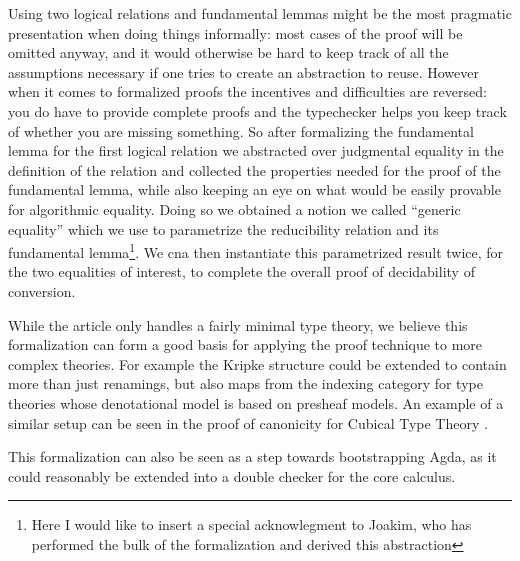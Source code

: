 \documentclass{book}
\begin{document}
Using two logical relations and fundamental lemmas might be the most
pragmatic presentation when doing things informally: most cases of the
proof will be omitted anyway, and it would otherwise be hard to keep
track of all the assumptions necessary if one tries to create an
abstraction to reuse. However when it comes to formalized proofs the
incentives and difficulties are reversed: you do have to provide
complete proofs and the typechecker helps you keep track of whether
you are missing something. So after formalizing the fundamental lemma
for the first logical relation we abstracted over judgmental equality
in the definition of the relation and collected the properties needed
for the proof of the fundamental lemma, while also keeping an eye on
what would be easily provable for algorithmic equality.  Doing so we
obtained a notion we called ``generic equality'' which we use to
parametrize the reducibility relation and its fundamental
lemma\footnote{Here I would like to insert a special acknowlegment to
  Joakim, who has performed the bulk of the formalization and derived
  this abstraction}. We cna then instantiate this parametrized result
twice, for the two equalities of interest, to complete the overall
proof of decidability of conversion.


While the article only handles a fairly minimal type theory, we
believe this formalization can form a good basis for applying the
proof technique to more complex theories. For example the Kripke
structure could be extended to contain more than just renamings, but
also maps from the indexing category for type theories whose
denotational model is based on presheaf models. An example of a
similar setup can be seen in the proof of canonicity for Cubical Type
Theory \cite{huber:16}.

This formalization can also be seen as a step towards bootstrapping
Agda, as it could reasonably be extended into a double checker for the
core calculus.
\end{document}
